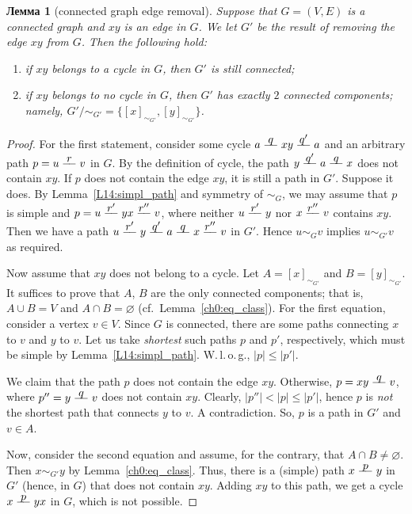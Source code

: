 \documentclass[12pt,notitlepage]{article}
\theoremstyle{plain}
\newtheorem{lemma}[thm]{Лемма}
\theoremstyle{definition}
\theoremstyle{plain}
\newcommand{\void}{\varnothing}
\newcommand{\1}{\mathbf{1}}
\newcommand{\0}{\mathbf{0}}
\newcommand{\pth}[1]{\overset{\raisebox{0.25em}{$ #1 $}}{\relbar\hspace{-.8mm}\relbar}}
\begin{document}
\begin{lemma}[connected graph edge removal]\label{L14:l_conn_rem}
	Suppose that $G = (V, E)$ is a connected graph and $xy$ is an edge in $G$. We let $G'$ be the result of removing the edge $xy$ from $G$. Then the following hold:
	\begin{enumerate}
		\item if $xy$ belongs to a cycle in $G$, then $G'$ is still connected;
		\item if $xy$ belongs to no cycle in $G$, then $G'$ has exactly $2$ connected components; namely, $G' / {\sim_{G'}} = \{ [x]_{\sim_{G'}}, [y]_{\sim_{G'}} \}$.
	\end{enumerate}
\end{lemma}
\begin{proof}
	For the first statement, consider some cycle $a \pth{q} x y \pth{q'} a$ and an arbitrary path $p = u \pth{r} v$ in $G$. By the definition of cycle, the path $y \pth{q'} a \pth{q} x$ does not contain $xy$. If $p$ does not contain the edge $xy$, it is still a path in $G'$. Suppose it does. By Lemma~\ref{L14:simpl_path} and symmetry of ${\sim_G}$, we may assume that $p$ is simple and $p = u \pth{r'} y x \pth{r''} v$, where neither $u \pth{r'} y$ nor $x \pth{r''} v$ contains $xy$. Then we have a path $u \pth{r'} y \pth{q'} a \pth{q} x \pth{r''} v$ in $G'$. Hence $u \sim_G v$ implies $u \sim_{G'} v$ as required.
	
	Now assume that $xy$ does not belong to a cycle. Let $A = [x]_{\sim_{G'}}$ and $B = [y]_{\sim_{G'}}$. It suffices to prove that $A$, $B$ are the only connected components; that is, $A \cup B = V$ and $A \cap B = \void$ (cf.~Lemma~\ref{ch0:eq_class}). For the first equation, consider a vertex $v \in V$. Since $G$ is connected, there are some paths connecting $x$ to $v$ and $y$ to $v$. Let us take \emph{shortest} such paths $p$ and $p'$, respectively, which must be simple by Lemma~\ref{L14:simpl_path}. W.\,l.\,o.\,g., $|p| \leq |p'|$.
	
	We claim that the path $p$ does not contain the edge $x y$. Otherwise, $p = x y \pth{q} v$, where $p'' = y \pth{q} v$ does not contain $x y$. Clearly, $|p''| < |p| \leq |p'|$, hence $p$ is \emph{not} the shortest path that connects $y$ to $v$. A contradiction. So, $p$ is a path in $G'$ and $v \in A$.
	
	Now, consider the second equation and assume, for the contrary, that $A \cap B \neq \void$. Then $x \sim_{G'} y$ by Lemma~\ref{ch0:eq_class}. Thus, there is a (simple) path $x \pth{p} y$ in $G'$ (hence, in $G$) that does not contain $x y$. Adding $x y$ to this path, we get a cycle $x \pth{p} y x$ in $G$, which is not possible.
\end{proof}
\end{document}
